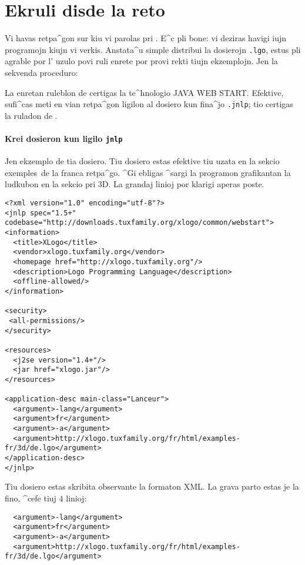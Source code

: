 \chapter{Ekruli \xlogo{} disde la reto}

Vi havas retpa^gon sur kiu vi parolas pri \xlogo{}.  E^c pli bone: vi
deziras havigi iujn programojn kiujn vi verkis.  Anstata^u simple
distribui la dosierojn \texttt{.lgo}, estus pli agrable por l' uzulo
povi ruli \xlogo{} enrete por provi rekti tiujn ekzemplojn.  Jen la
sekvenda proceduro:

La enretan ruleblon de \xlogo{} certigas la te^hnologio \textsc{JAVA
  WEB START}.  Efektive, sufi^cas meti en vian retpa^gon ligilon al
dosiero kun fina^jo \texttt{.jnlp}; tio certigas la ruladon de
\xlogo{}.

\subsubsection*{Krei dosieron kun ligilo \texttt{jnlp}}

Jen ekzemplo de tia dosiero.  Tiu dosiero estas efektive tiu uzata en
la sekcio \og exemples\fg\ de la franca retpa^go.  ^Gi ebligas ^sargi
la programon grafikantan la ludkubon en la sekcio pri 3D.  La grandaj
linioj por klarigi aperas poste.

\begin{verbatim}
<?xml version="1.0" encoding="utf-8"?>
<jnlp spec="1.5+" codebase="http://downloads.tuxfamily.org/xlogo/common/webstart">
<information>
  <title>XLogo</title>
  <vendor>xlogo.tuxfamily.org</vendor>
  <homepage href="http://xlogo.tuxfamily.org"/>
  <description>Logo Programming Language</description>
  <offline-allowed/>
</information>

<security>
 <all-permissions/>
</security>

<resources>
  <j2se version="1.4+"/>
  <jar href="xlogo.jar"/>
</resources>

<application-desc main-class="Lanceur">
  <argument>-lang</argument>
  <argument>fr</argument>
  <argument>-a</argument>
  <argument>http://xlogo.tuxfamily.org/fr/html/examples-fr/3d/de.lgo</argument>
</application-desc>
</jnlp>
\end{verbatim}

Tiu dosiero estas skribita observante la formaton XML.
La grava parto estas je la fino, ^cefe tiuj $4$ linioj:
\begin{verbatim}
  <argument>-lang</argument>
  <argument>fr</argument>
  <argument>-a</argument>
  <argument>http://xlogo.tuxfamily.org/fr/html/examples-fr/3d/de.lgo</argument>
\end{verbatim}

